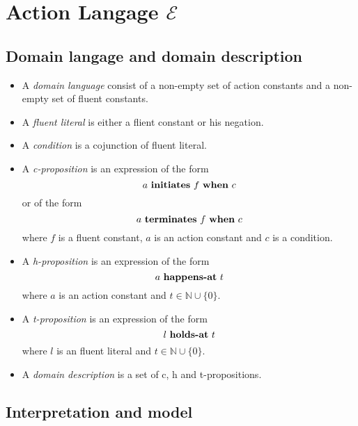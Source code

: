 \section{Action Langage $\mathcal{E}$}\label{sec:e}

\theoremstyle{definition}
\newtheorem{definition}{Definition}[section]

\subsection{Domain langage and domain description}

\begin{itemize}
  \item A \emph{domain language} consist of a non-empty set of action constants and a non-empty set of fluent constants.
  \item A \emph{fluent literal} is either a flient constant or his negation.
  \item A \emph{condition} is a cojunction of fluent literal.
  \item A \emph{c-proposition} is an expression of the form
    \begin{equation}\label{c1}
    	a \text{ \textbf{initiates} } f \text{ \textbf{when} } c
    \end{equation}
    or of the form
    \begin{equation}\label{c2}
    	a \text{ \textbf{terminates} } f \text{ \textbf{when} } c
    \end{equation}
    where $f$ is a fluent constant, $a$ is an action constant and $c$ is a condition.
  \item A \emph{h-proposition} is an expression of the form
    \begin{equation}\label{h}
      a \text{ \textbf{happens-at} } t
    \end{equation}
    where $a$ is an action constant and $t \in \mathbb{N} \cup \{0\}$.
  \item A \emph{t-proposition} is an expression of the form
    \begin{equation}\label{h}
      l \text{ \textbf{holds-at} } t
    \end{equation}
    where $l$ is an fluent literal and $t \in \mathbb{N} \cup \{0\}$.
  \item A \emph{domain description} is a set of c, h and t-propositions.
\end{itemize}

\subsection{Interpretation and model}

